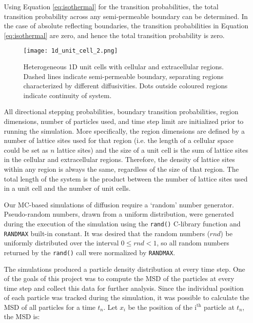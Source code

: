 	Using Equation \ref{eq:isothermal} for the transition probabilities, the total transition probability across any semi-permeable boundary can be determined. In the case of absolute reflecting boundaries, the transition probabilities in Equation \ref{eq:isothermal} are zero, and hence the total transition probability is zero.
	
	\begin{figure}[h]
		\centering
		\texttt{[image: 1d\_unit\_cell\_2.png]}
		\caption[Heterogeneous 1D cell model]{Heterogeneous 1D unit cells with cellular and extracellular regions. Dashed lines indicate semi-permeable boundary, separating regions characterized by different diffusivities. Dots outside coloured regions indicate continuity of system.}
		\label{fig:1d_unit_cell_2.png}
	\end{figure}
	
	\newpage
	All directional stepping probabilities, boundary transition probabilities, region dimensions, number of particles used, and time step limit are initialized prior to running the simulation. More specifically, the region dimensions are defined by a number of lattice sites used for that region (i.e. the length of a cellular space could be set as $ n $ lattice sites) and the size of a unit cell is the sum of lattice sites in the cellular and extracellular regions. Therefore, the density of lattice sites within any region is always the same, regardless of the size of that region. The total length of the system is the product between the number of lattice sites used in a unit cell and the number of unit cells.
	 	
	Our MC-based simulations of diffusion require a `random' number generator. Pseudo-random numbers, drawn from a uniform distribution, were generated during the execution of the simulation using the \texttt{rand()} C-library function and \texttt{RAND\textunderscore MAX} built-in constant. It was desired that the random numbers ($ rnd $) be uniformly distributed over the interval $ 0 \leq rnd < 1 $, so all random numbers returned by the \texttt{rand()} call were normalized by \texttt{RAND\textunderscore MAX}.
	
	The simulations produced a particle density distribution at every time step. One of the goals of this project was to compute the MSD of the particles at every time step and collect this data for further analysis. Since the individual position of each particle was tracked during the simulation, it was possible to calculate the MSD of all particles for a time $ t_n $. Let $ x_i $ be the position of the $ \textrm{i}^\textrm{th} $ particle at $ t_n $, the MSD is:
	
